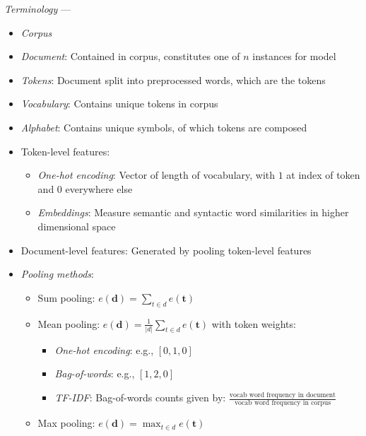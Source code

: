 \emph{Terminology} --- 
\begin{itemize}
    \item \emph{Corpus}
    \item \emph{Document}: Contained in corpus, constitutes one of $n$ instances for model
    \item \emph{Tokens}: Document split into preprocessed words, which are the tokens
    \item \emph{Vocabulary}: Contains unique tokens in corpus
    \item \emph{Alphabet}: Contains unique symbols, of which tokens are composed
    \item Token-level features: 
    \begin{itemize}
        \item \emph{One-hot encoding}: Vector of length of vocabulary, with $1$ at index of token and $0$ everywhere else
        \item \emph{Embeddings}: Measure semantic and syntactic word similarities in higher dimensional space
    \end{itemize}
    \item Document-level features: Generated by pooling token-level features
    \item \emph{Pooling methods}:
    \begin{itemize}
        \item Sum pooling: $e(\boldsymbol{d}) = \sum_{t \in d} e(\boldsymbol{t})$
        \item Mean pooling: $e(\boldsymbol{d}) = \frac{1}{|d|} \sum_{t \in d} e(\boldsymbol{t})$ with token weights:
        \begin{itemize}
            \item \emph{One-hot encoding}: e.g., $[0, 1, 0]$
            \item \emph{Bag-of-words}: e.g., $[1, 2, 0]$
            \item \emph{TF-IDF}: Bag-of-words counts given by: $\frac{\textrm{vocab word frequency in document}}{\textrm{vocab word frequency in corpus}}$
        \end{itemize}
        \item Max pooling: $e(\boldsymbol{d}) = \max_{t \in d} e(\boldsymbol{t})$
    \end{itemize}
\end{itemize}

